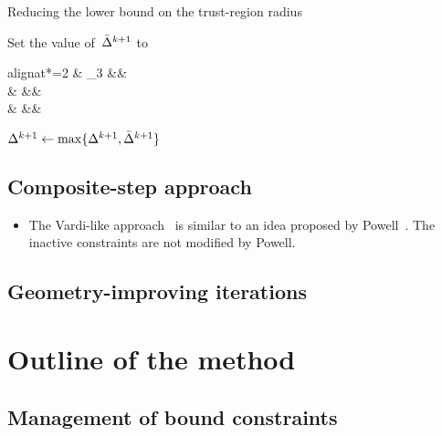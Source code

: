 \begin{algorithm}
    \caption{Reducing the lower bound on the trust-region radius}
    \label{alg:reducing-lower-bound-trust-region-radius}
    \DontPrintSemicolon
    Set the value of~$\radlb[k + 1]$ to
    \begin{algoempheq}[left={\radlb[k + 1] \gets \empheqlbrace}]{alignat*=2}
        & \theta_3 \radlb[k]                && \quad {}\\
        & \sqrt{\radlb[k] \radlb[\infty]}   && \quad {}\\
        & \radlb[\infty]                    && \quad {}
    \end{algoempheq}
    $\rad[k + 1] \gets \max \set{\rad[k + 1], \radlb[k + 1]}$\;
\end{algorithm}

\subsection{Composite-step approach}

\begin{itemize}
    \item The Vardi-like approach~\cite{Vardi_1985} is similar to an idea proposed by Powell~\cite[eq.~(2.7) and~(2.8)]{Powell_1978a}.
    The inactive constraints are not modified by Powell.
\end{itemize}

\subsection{Geometry-improving iterations}
\label{subsec:geometry-improving-iterations}

\section{Outline of the  method}

\subsection{Management of bound constraints}
\label{subsec:bound-constraints}

